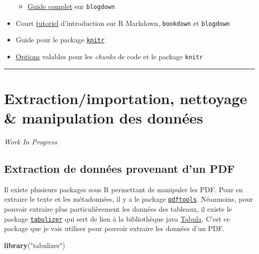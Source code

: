 \documentclass[
  french,
]{book}
\newenvironment{Shaded}{\begin{snugshade}}{\end{snugshade}}
\newcommand{\KeywordTok}[1]{\textcolor[rgb]{0.13,0.29,0.53}{\textbf{#1}}}
\newcommand{\NormalTok}[1]{#1}
\newcommand{\StringTok}[1]{\textcolor[rgb]{0.31,0.60,0.02}{#1}}
\providecommand{\tightlist}{%
  \setlength{\itemsep}{0pt}\setlength{\parskip}{0pt}}
\newenvironment{infobox}[1]
  {
  \begin{itemize}
  \renewcommand{\labelitemi}{
    \raisebox{-.7\height}[0pt][0pt]{
      {\setkeys{Gin}{width=3em,keepaspectratio}
        \texttt{[image: images/\#1]}}
    }
  }
  \setlength{\fboxsep}{1em}
  \begin{blackbox}
  \item
  }
  {
  \end{blackbox}
  \end{itemize}
  }
\begin{document}
\begin{itemize}
  \begin{itemize}
  \tightlist
  \item
    \href{https://bookdown.org/yihui/blogdown/}{Guide complet} sur \texttt{blogdown}
  \end{itemize}
\item
  Court \href{https://slides.yihui.org/2017-rmarkdown-UNL-Yihui-Xie.html\#1}{tutoriel}
  d'introduction sur R Markdown, \texttt{bookdown} et \texttt{blogdown}
\item
  Guide pour le package \href{https://yihui.org/knitr/}{\texttt{knitr}}
\item
  \href{https://yihui.org/knitr/options/}{Options} valables pour les \emph{chunks} de code
  et le package \texttt{knitr}
\end{itemize}

\begin{center}\rule{0.5\linewidth}{0.5pt}\end{center}

\hypertarget{data-analysis}{%
\chapter{Extraction/importation, nettoyage \& manipulation des données}\label{data-analysis}}

\begin{infobox}{caution}

\emph{\emph{Work In Progress}}

\end{infobox}

\hypertarget{extraction-de-donnuxe9es-provenant-dun-pdf}{%
\section{Extraction de données provenant d'un PDF}\label{extraction-de-donnuxe9es-provenant-dun-pdf}}

Il existe plusieurs packages sous R permettant de manipuler les PDF. Pour en
extraire le texte et les métadonnées, il y a le package
\href{https://github.com/ropensci/pdftools}{\texttt{pdftools}}. Néanmoins, pour pouvoir
extraire plus particulièrement les données des tableaux, il existe le package
\href{https://github.com/ropensci/tabulizer}{\texttt{tabulizer}} qui sert de lien à la
bibliothèque java \href{https://github.com/tabulapdf/tabula-java/}{Tabula}. C'est ce
package que je vais utiliser pour pouvoir extraire les données d'un PDF.

\begin{Shaded}
\begin{Highlighting}[]
\KeywordTok{library}\NormalTok{(}\StringTok{"tabulizer"}\NormalTok{)}
\end{Highlighting}
\end{Shaded}
\end{document}
